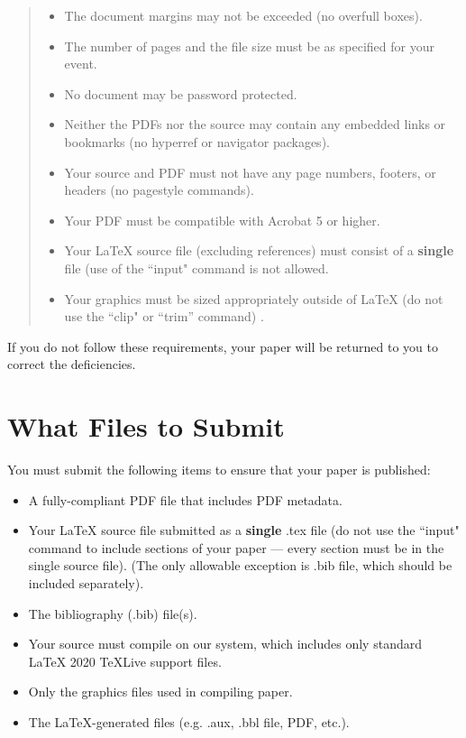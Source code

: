 \documentclass[letterpaper]{article} \usepackage{aaai21}  \usepackage{times}  \usepackage{helvet} \usepackage{courier}  \usepackage[hyphens]{url}  \usepackage{graphicx} \urlstyle{rm} \def\UrlFont{\rm}  \usepackage{natbib}  \usepackage{caption} \frenchspacing  \setlength{\pdfpagewidth}{8.5in}  \setlength{\pdfpageheight}{11in}  \usepackage{cite}
\begin{document}
\begin{quote}
\begin{itemize}
\item The document margins may not be exceeded (no overfull boxes).
\item The number of pages and the file size must be as specified for your event.
\item No document may be password protected.
\item Neither the PDFs nor the source may contain any embedded links or bookmarks (no hyperref or navigator packages).
\item Your source and PDF must not have any page numbers, footers, or headers (no pagestyle commands).
\item Your PDF must be compatible with Acrobat 5 or higher.
\item Your \LaTeX{} source file (excluding references) must consist of a \textbf{single} file (use of the ``input" command is not allowed.
\item Your graphics must be sized appropriately outside of \LaTeX{} (do not use the ``clip" or ``trim'' command) .
\end{itemize}
\end{quote}

If you do not follow these requirements, your paper will be returned to you to correct the deficiencies.

\section{What Files to Submit}
You must submit the following items to ensure that your paper is published:
\begin{itemize}
\item A fully-compliant PDF file that includes PDF metadata.
\item Your \LaTeX{} source file submitted as a \textbf{single} .tex file (do not use the ``input" command to include sections of your paper --- every section must be in the single source file). (The only allowable exception is .bib file, which should be included separately).
\item The bibliography (.bib) file(s).
\item Your source must compile on our system, which includes only standard \LaTeX{} 2020 TeXLive support files.
\item Only the graphics files used in compiling paper.
\item The \LaTeX{}-generated files (e.g. .aux,  .bbl file, PDF, etc.).
\end{itemize}
\end{document}
